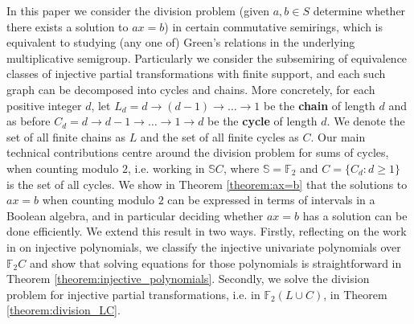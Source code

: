 \documentclass[a4paper, 11pt]{article}
\theoremstyle{plain}
\theoremstyle{definition}
\newcommand{\F} {\mathbb{F}}
\newcommand{\Define}    [1] {\textbf{#1}}
\begin{document}
In this paper we consider the division problem  (given $a, b \in S$ determine whether there exists a solution to $ax=b$) in certain commutative semirings, which is equivalent to studying (any one of) Green's relations in the underlying multiplicative semigroup. Particularly we consider the subsemiring of equivalence classes of injective partial transformations with finite support, and each such graph can be decomposed into cycles and chains. More concretely, for each positive integer $d$, let $L_d = d \to (d-1) \to \dots \to 1$ be the \Define{chain} of length $d$ and as before $C_d = d \to d-1 \to \dots \to 1 \to d$ be the \Define{cycle} of length $d$. We denote the set of all finite chains as $L$ and the set of all finite cycles as $C$. Our main technical contributions centre around the division problem for sums of cycles, when counting modulo $2$, i.e. working in $\mathbb{S}C$, where $\mathbb{S} = \mathbb{F}_2$ and $C = \{C_d : d \ge 1\}$ is the set of all cycles. We show in Theorem \ref{theorem:ax=b} that the solutions to $ax = b$ when counting modulo $2$ can be expressed in terms of intervals in a Boolean algebra, and in particular deciding whether $ax = b$ has a solution can be done efficiently.  We extend this result in two ways. Firstly, reflecting on the work in \cite{PR25CiE} on injective polynomials, we classify the injective univariate polynomials over $\F_2 C$ and show that solving equations for those polynomials is straightforward in Theorem \ref{theorem:injective_polynomials}. Secondly, we solve the division problem for injective partial transformations, i.e. in $\F_2(L \cup C)$, in Theorem \ref{theorem:division_LC}. 
\end{document}
